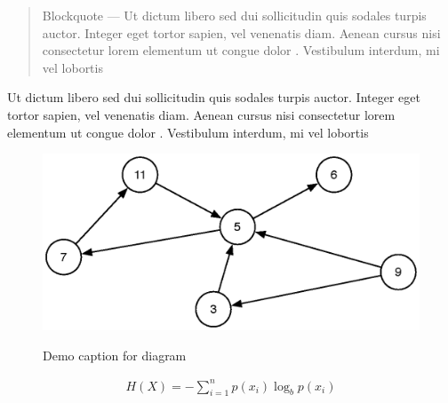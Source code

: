 \begin{quote}
Blockquote --- Ut dictum libero sed dui sollicitudin quis sodales turpis
auctor. Integer eget tortor sapien, vel venenatis diam. Aenean cursus
nisi consectetur lorem elementum ut congue dolor . Vestibulum interdum,
mi vel lobortis
\end{quote}

Ut dictum libero sed dui sollicitudin quis sodales turpis auctor.
Integer eget tortor sapien, vel venenatis diam. Aenean cursus nisi
consectetur lorem elementum ut congue dolor . Vestibulum interdum, mi
vel lobortis

\begin{figure}[H]
  \centering
     \includegraphics[scale=0.6]{demo-diagram.eps}
  \label{fig:demo-diagram}
  \caption{Demo caption for diagram}
\end{figure}

\begin{align}
H(X) = - \sum_{i=1}^{n}p(x_i)\log_bp(x_i)
\end{align}
